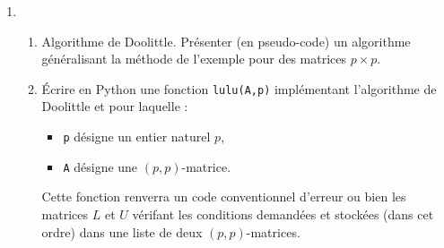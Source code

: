 \begin{enumerate}
  \item 
\begin{enumerate}
  \item Algorithme de Doolittle. Présenter (en pseudo-code) un algorithme généralisant la méthode de l'exemple pour des matrices $p\times p$.
  \item \'Ecrire en Python une fonction \texttt{lulu(A,p)} implémentant l'algorithme de Doolittle et pour laquelle :
\begin{itemize}
  \item \texttt{p} désigne un entier naturel $p$,
  \item \texttt{A} désigne une $(p,p)$-matrice. 
\end{itemize}
Cette fonction renverra un code conventionnel d'erreur ou bien les matrices $L$ et $U$ vérifant les conditions demandées et stockées (dans cet ordre) dans une liste de deux $(p,p)$-matrices.
\end{enumerate}
    

\end{enumerate}
